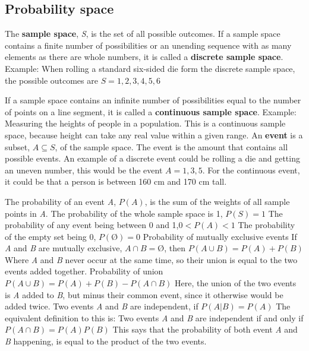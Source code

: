 \subsection{Probability space}

The \textbf{sample space}, \textit{S}, is the set of all possible outcomes.
\newline
If a sample space contains a finite number of possibilities or an unending sequence with as many elements as there are whole numbers, it is called a \textbf{discrete sample space}.
\newline
Example: When rolling a standard six-sided die form the discrete sample space, the possible outcomes are $S={1,2,3,4,5,6}$ 
\newline

If a sample space contains an infinite number of possibilities equal to the number of points on a line segment, it is called a \textbf{continuous sample space}.
\break
Example: Measuring the heights of people in a population. This is a continuous sample space, because height can take any real value within a given range. 
\newline
An \textbf{event} is a subset, $A\subseteq S$, of the sample space. The event is the amount that contains all possible events.
An example of a discrete event could be rolling a die and getting an uneven number, this would be the event $A={1,3,5}$.
\newline 
For the continuous event, it could be that a person is between 160 cm and 170 cm tall.
\newline

The probability of an event \textit{A}, $P(A)$, is the sum of the weights of all sample points in \textit{A}.
The probability of the whole sample space is 1, $P(S)=1$
The probability of any event being between 0 and 1,$0<P(A)<1$
The probability of the empty set being 0, $P(Ø)=0$
\newline
\newline
Probability of mutually exclusive events
\newline
If \textit{A} and \textit{B} are mutually exclusive, $A \cap B=Ø$, then
\newline
$P(A \cup B) = P(A)+P(B)$
\newline
\newline
Where \textit{A} and \textit{B} never occur at the same time, so their union is equal to the two events added together. 
\newline
Probability of union
\newline
$P(A \cup B)=P(A)+P(B)-P(A \cap B)$
\newline
Here, the union of the two events is \textit{A} added to \textit{B}, but minus their common event, since it otherwise would be added twice. 
\newline
Two events \textit{A} and \textit{B} are independent, if 
\newline
$P(A|B)=P(A)$
\newline
The equivalent definition to this is:
\newline
Two events \textit{A} and \textit{B} are independent if and only if 
\newline
$P(A \cap B)=P(A)P(B)$
This says that the probability of both event \textit{A} and \textit{B} happening, is equal to the product of the two events.
